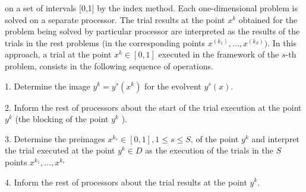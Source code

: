 \documentclass[runningheads]{llncs}
\begin{document}
on a set of intervals [0,1] by the index method. Each one-dimensional problem is solved on a separate processor. The trial results at the point \(x^k\) obtained for the problem being solved by particular processor are interpreted as the results of the trials in the rest problems (in the corresponding points \(x^(k_1 ),…,x^(k_S ))\). In this approach, a trial at the point \(x^k \in [0,1]\) executed in the framework of the \(s\)-th problem, consists in the following sequence of operations.
\par
1. Determine the image \(y^k=y^s (x^k)\) for the evolvent \(y^s (x)\).
\par
2. Inform the rest of processors about the start of the trial execution at the point\( y^k\) (the blocking of the point \(y^k\) ).
\par
3. Determine the preimages \(x{}^{k_s}  \in [0,1], 1≤s≤S\), of the point \(y^k\) and interpret the trial executed at the point \(y^k \in D \) as the execution of the trials in the \(S\) points \(x{}^{k_1} ,…,x{}^{k_s} \)
\par
4. Inform the rest of processors about the trial results at the point \(y^k\).
\par
\end{document}
